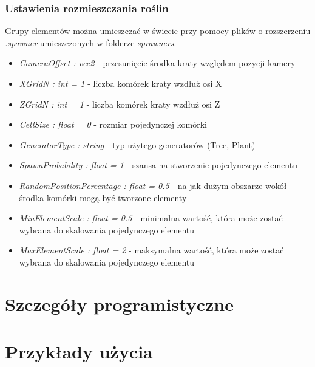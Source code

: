 \documentclass[inz,longabstract]{iithesis}
\begin{document}
        \subsection{Ustawienia rozmieszczania roślin}
        Grupy elementów można umieszczać w świecie przy pomocy plików o rozszerzeniu
        \textit{.spawner} umieszczonych w folderze \textit{sprawners}.
        \begin{itemize}
            \item \textit{CameraOffset : vec2} - przesunięcie środka kraty względem pozycji kamery
            \item \textit{XGridN : int = 1} - liczba komórek kraty wzdłuż osi X
            \item \textit{ZGridN : int = 1} - liczba komórek kraty wzdłuż osi Z
            \item \textit{CellSize : float = 0} - rozmiar pojedynczej komórki
            \item \textit{GeneratorType : string} - typ użytego generatorów (Tree, Plant)
            \item \textit{SpawnProbability : float = 1} - szansa na stworzenie pojedynczego elementu 
            \item \textit{RandomPositionPercentage : float = 0.5} - na jak dużym obszarze wokół środka komórki mogą być tworzone elementy
            \item \textit{MinElementScale : float = 0.5} - minimalna wartość, która może zostać wybrana do skalowania pojedynczego elementu
            \item \textit{MaxElementScale : float = 2} - maksymalna wartość, która może zostać wybrana do skalowania pojedynczego elementu
        \end{itemize}
    
        
\chapter{Szczegóły programistyczne}

\chapter{Przykłady użycia}





\end{document}
